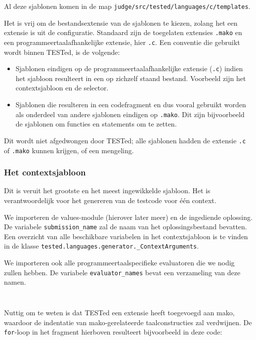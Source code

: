 Al deze sjablonen komen in de map \texttt{judge/src/tested/languages/c/templates}.

Het is vrij om de bestandsextensie van de sjablonen te kiezen, zolang het een extensie is uit de configuratie.
Standaard zijn de toegelaten extensies \texttt{.mako} en een programmeertaalafhankelijke extensie, hier \texttt{.c}.
Een conventie die gebruikt wordt binnen TESTed, is de volgende:

\begin{itemize}
    \item Sjablonen eindigen op de programmeertaalafhankelijke extensie (\texttt{.c}) indien het sjabloon resulteert in een op zichzelf staand bestand.
    Voorbeeld zijn het contextsjabloon en de selector.
    \item Sjablonen die resulteren in een codefragment en dus vooral gebruikt worden als onderdeel van andere sjablonen eindigen op \texttt{.mako}.
    Dit zijn bijvoorbeeld de sjablonen om functies en statements om te zetten.
\end{itemize}

Dit wordt niet afgedwongen door TESTed;
alle sjablonen hadden de extensie \texttt{.c} of \texttt{.mako} kunnen krijgen, of een mengeling.

\subsubsection{Het contextsjabloon}

Dit is veruit het grootste en het meest ingewikkelde sjabloon.
Het is verantwoordelijk voor het genereren van de testcode voor één context.

We importeren de values-module (hierover later meer) en de ingediende oplossing.
De variabele \texttt{submission\_name} zal de naam van het oplossingsbestand bevatten.
Een overzicht van alle beschikbare variabelen in het contextsjabloon is te vinden in de klasse \texttt{tested.languages.generator.\_ContextArguments}.

We importeren ook alle programmeertaalspecifieke evaluatoren die we nodig zullen hebben.
De variabele \texttt{evaluator\_names} bevat een verzameling van deze namen.

\inputminted[firstline=3,lastline=7]{mako}{sources/c-context.mako}
\vspace{-1.7cm} %
\inputminted[firstline=9,lastline=11]{mako}{sources/c-context.mako}

Nuttig om te weten is dat TESTed een extensie heeft toegevoegd aan mako, waardoor de indentatie van mako-gerelateerde taalconstructies zal verdwijnen.
De \texttt{for}-loop in het fragment hierboven resulteert bijvoorbeeld in deze code:

